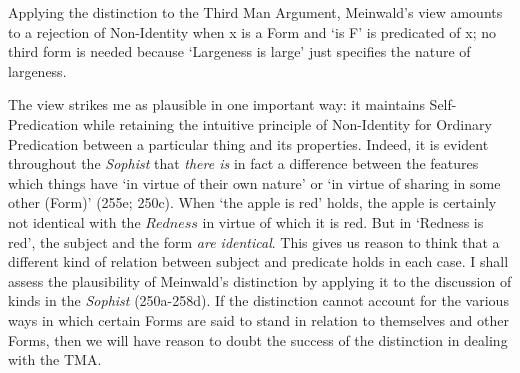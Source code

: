 \documentclass [article] {memoir}
\begin{document}
Applying the distinction to the Third Man Argument, Meinwald’s view amounts to a rejection of Non-Identity when x is a Form and `is F' is predicated of x; no third form is needed because `Largeness is large' just specifies the nature of largeness. 

The view strikes me as plausible in one important way: it maintains Self-Predication while retaining the intuitive principle of Non-Identity for Ordinary Predication between a particular thing and its properties. Indeed, it is evident throughout the \textit{Sophist} that \textit{there is} in fact a difference between the features which things have `in virtue of their own nature' or `in virtue of sharing in some other (Form)' (255e; 250c). When `the apple is red' holds, the apple is certainly not identical with the $Redness$ in virtue of which it is red. But in `Redness is red', the subject and the form \textit{are identical}. This gives us reason to think that a different kind of relation between subject and predicate holds in each case. I shall assess the plausibility of Meinwald's distinction by applying it to the discussion of kinds in the \textit{Sophist} (250a-258d). If the distinction cannot account for the various ways in which certain Forms are said to stand in relation to themselves and other Forms, then we will have reason to doubt the success of the distinction in dealing with the TMA. 
\end{document}
